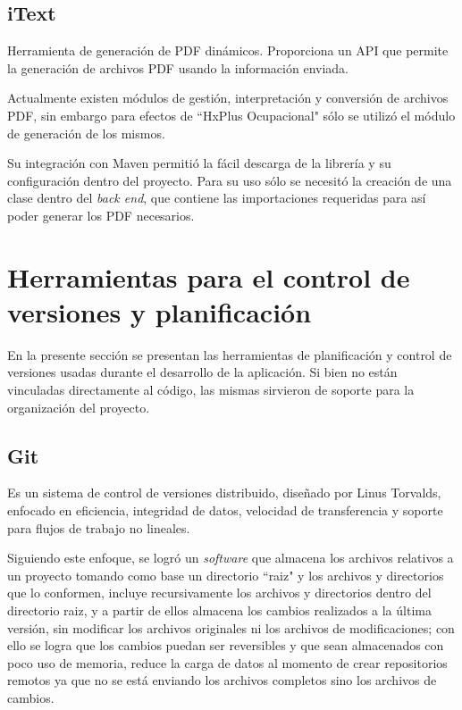         \subsection{iText}
        \label{tecno-itext}
        
        Herramienta de generación de PDF dinámicos\cite{ITEXT-basico}. Proporciona un API que permite la generación de archivos PDF usando la información enviada.
        
        Actualmente existen módulos de gestión, interpretación y conversión de archivos PDF, sin embargo para efectos de ``HxPlus Ocupacional" sólo se utilizó el módulo de generación de los mismos.
        
        Su integración con Maven permitió la fácil descarga de la librería y su configuración dentro del proyecto. Para su uso sólo se necesitó la creación de una clase dentro del \textit{back end}, que contiene las importaciones requeridas para así poder generar los PDF necesarios.
        
    \section{Herramientas para el control de versiones y planificación}
    
    En la presente sección se presentan las herramientas de planificación y control de versiones usadas durante el desarrollo de la aplicación. Si bien no están vinculadas directamente al código, las mismas sirvieron de soporte para la organización del proyecto.
    
        \subsection{Git}
        \label{tecno-git}
        
        Es un sistema de control de versiones distribuido, diseñado por Linus Torvalds, enfocado en eficiencia, integridad de datos, velocidad de transferencia y soporte para flujos de trabajo no lineales.
        
        Siguiendo este enfoque, se logró un \textit{software} que almacena los archivos relativos a un proyecto tomando como base un directorio ``raiz" y los archivos y directorios que lo conformen, incluye recursivamente los archivos y directorios dentro del directorio raiz, y  a partir de ellos almacena los cambios realizados a la última versión, sin modificar los archivos originales ni los archivos de modificaciones; con ello se logra que los cambios puedan ser reversibles y que sean almacenados con poco uso de memoria, reduce la carga de datos al momento de crear repositorios remotos ya que no se está enviando los archivos completos sino los archivos de cambios.
        
